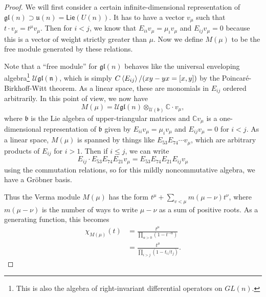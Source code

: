 \documentclass[leqno, openany]{memoir}
\theoremstyle{definition}
\theoremstyle{remark}
\theoremstyle{plain}
\theoremstyle{definition}
\theoremstyle{remark}
\newcommand{\C}{\mathbb{C}}
\newcommand{\mc}[1]{\mathcal{#1}}
\newcommand{\mf}[1]{\mathfrak{#1}}
\newcommand{\ms}[1]{\mathsf{#1}}
\begin{document}
\begin{proof}
    We will first consider a certain infinite-dimensional representation of $\mf{gl}(n) \supset \mf{u}(n) = \ms{Lie}(U(n))$. It has to have a vector $v_{\mu}$ such that $t \cdot v_{\mu} = t^{\mu} v_{\mu}$. Then for $i < j$, we know that $E_{ii} v_{\mu} = \mu_i v_{\mu}$ and $E_{ij} v_{\mu} = 0$ because this is a vector of weight strictly greater than $\mu$. Now we define $M(\mu)$ to be the free module generated by these relations.

    Note that a ``free module'' for $\mf{gl}(n)$ behaves like the universal enveloping algebra\footnote{This is also the algebra of right-invariant differential operators on $GL(n)$.} $\mc{U} {\mf{gl(n)}}$, which is simply $C \ev{E_{ij}} / (xy-yx = [x,y])$ by the Poincar\'e-Birkhoff-Witt theorem. As a linear space, these are monomials in $E_{ij}$ ordered arbitrarily. In this point of view, we now have
    \[ M(\mu) = \mc{U} \mf{gl}(n) \otimes_{\mc{U}(\mf{b})} \C \cdot v_{\mu}, \]
    where $\mf{b}$ is the Lie algebra of upper-triangular matrices and 
    $\C v_{\mu}$ is a one-dimensional representation of $\mf{b}$ given by $E_{ii} v_{\mu} = \mu_i v_{\mu}$ and $E_{ij} v_{\mu} = 0$ for $i < j$. 
    As a linear space, $M(\mu)$ is spanned by things like $E_{53} E_{74} \cdots v_{\mu}$, which are arbitrary products of $E_{ij}$ for $i > 1$. Then if $i \leq j$, we can write
    \[ E_{ij} \cdot E_{53} E_{74} E_{21} v_{\mu} = E_{53} E_{74} E_{21} E_{ij} v_{\mu} \]
    using the commutation relations, so for this mildly noncommutative algebra, we have a Gr\"obner basis.

    Thus the Verma module $M(\mu)$ has the form $t^{\mu} + \sum_{v < \mu} m(\mu-\nu) t^{\nu}$, where $m(\mu - \nu)$ is the number of ways to write $\mu - \nu$ as a sum of positive roots. As a generating function, this becomes 
    \begin{align*}
        \chi_{M(\mu)}(t) &= \frac{t^{\mu}}{\prod_{\alpha > 0} (1-t^{-\alpha})} \\
                         &= \frac{t^{\mu}}{\prod_{i>j} (1- t_i / t_j)}. 
    \end{align*}


\end{proof}
\end{document}
